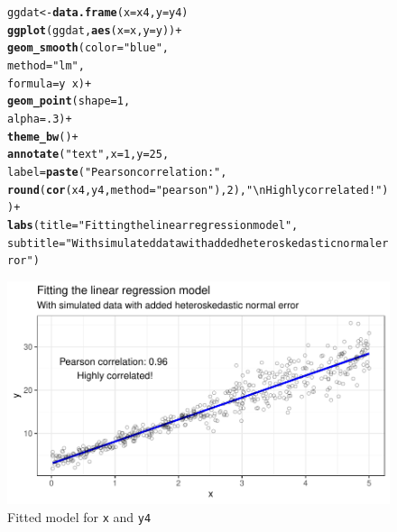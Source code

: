 \documentclass{article}\usepackage[]{graphicx}\usepackage[]{color}
\makeatletter
\def\maxwidth{ %
  \ifdim\Gin@nat@width>\linewidth
    \linewidth
  \else
    \Gin@nat@width
  \fi
}
\newcommand{\hlnum}[1]{\textcolor[rgb]{0.686,0.059,0.569}{#1}}%
\newcommand{\hlstr}[1]{\textcolor[rgb]{0.192,0.494,0.8}{#1}}%
\newcommand{\hlopt}[1]{\textcolor[rgb]{0,0,0}{#1}}%
\newcommand{\hlstd}[1]{\textcolor[rgb]{0.345,0.345,0.345}{#1}}%
\newcommand{\hlkwb}[1]{\textcolor[rgb]{0.69,0.353,0.396}{#1}}%
\newcommand{\hlkwc}[1]{\textcolor[rgb]{0.333,0.667,0.333}{#1}}%
\newcommand{\hlkwd}[1]{\textcolor[rgb]{0.737,0.353,0.396}{\textbf{#1}}}%
\newenvironment{kframe}{%
 \def\at@end@of@kframe{}%
 \ifinner\ifhmode%
  \def\at@end@of@kframe{\end{minipage}}%
  \begin{minipage}{\columnwidth}%
 \fi\fi%
 \def\FrameCommand##1{\hskip\@totalleftmargin \hskip-\fboxsep
 \colorbox{shadecolor}{##1}\hskip-\fboxsep
     \hskip-\linewidth \hskip-\@totalleftmargin \hskip\columnwidth}%
 \MakeFramed {\advance\hsize-\width
   \@totalleftmargin\z@ \linewidth\hsize
   \@setminipage}}%
 {\par\unskip\endMakeFramed%
 \at@end@of@kframe}
\newenvironment{knitrout}{}{} %
\makeatother
\begin{document}
\begin{enumerate}
\begin{enumerate}
\begin{figure}[H]
\begin{center}
\begin{knitrout}
\color{fgcolor}\begin{kframe}
\begin{alltt}
\hlstd{ggdat}\hlkwb{<-}\hlkwd{data.frame}\hlstd{(}\hlkwc{x}\hlstd{=x4,} \hlkwc{y}\hlstd{=y4)}
\hlkwd{ggplot}\hlstd{(ggdat,} \hlkwd{aes}\hlstd{(}\hlkwc{x}\hlstd{=x,} \hlkwc{y}\hlstd{=y))}\hlopt{+}
  \hlkwd{geom_smooth}\hlstd{(}\hlkwc{color}\hlstd{=}\hlstr{"blue"}\hlstd{,}
              \hlkwc{method}\hlstd{=}\hlstr{"lm"}\hlstd{,}
              \hlkwc{formula}\hlstd{=y}\hlopt{~}\hlstd{x)}\hlopt{+}
  \hlkwd{geom_point}\hlstd{(}\hlkwc{shape}\hlstd{=}\hlnum{1}\hlstd{,}
             \hlkwc{alpha}\hlstd{=}\hlnum{.3}\hlstd{)}\hlopt{+}
  \hlkwd{theme_bw}\hlstd{()}\hlopt{+}
  \hlkwd{annotate}\hlstd{(}\hlstr{"text"}\hlstd{,} \hlkwc{x}\hlstd{=}\hlnum{1}\hlstd{,} \hlkwc{y}\hlstd{=}\hlnum{25}\hlstd{,}
           \hlkwc{label}\hlstd{=}\hlkwd{paste}\hlstd{(}\hlstr{"Pearson correlation:"}\hlstd{,}
                       \hlkwd{round}\hlstd{(}\hlkwd{cor}\hlstd{(x4,y4,}\hlkwc{method}\hlstd{=}\hlstr{"pearson"}\hlstd{),}\hlnum{2}\hlstd{),}\hlstr{"\textbackslash{}nHighly correlated!"}\hlstd{))}\hlopt{+}
  \hlkwd{labs}\hlstd{(}\hlkwc{title}\hlstd{=}\hlstr{"Fitting the linear regression model"}\hlstd{,}
       \hlkwc{subtitle}\hlstd{=}\hlstr{"With simulated data with added heteroskedastic normal error"}\hlstd{)}
\end{alltt}
\end{kframe}
\includegraphics[width=\maxwidth]{figure/p3plot6-1} 
\end{knitrout}
\caption{Fitted model for \texttt{x} and \texttt{y4}}
\label{p3plot6}
\end{center}
\end{figure}


\end{enumerate}
\end{enumerate}
\end{document}
